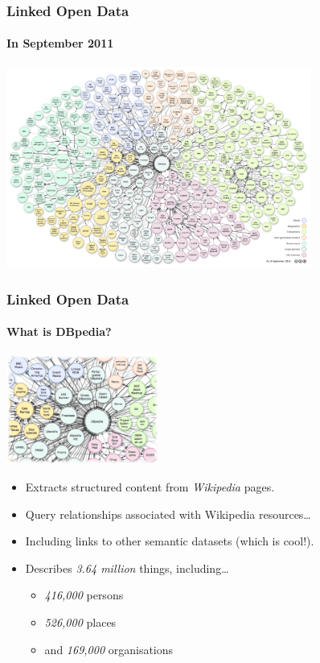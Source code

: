 \documentclass{beamer}
\begin{document}
\begin{frame}
\frametitle{Linked Open Data}
\framesubtitle{In September 2011}

\begin{center}
\includegraphics[width=100mm]{images/lod-2011.pdf}
\end{center}

\end{frame}


\begin{frame}
\frametitle{Linked Open Data}
\framesubtitle{What is DBpedia?}

\begin{center}
\includegraphics[width=50mm]{images/lod-2011-dbpedia.pdf}
\end{center}

\begin{itemize}
\item Extracts structured content from \emph{Wikipedia} pages.
\item Query relationships associated with Wikipedia resources\ldots
\item Including links to other semantic datasets (which is cool!).
\item Describes \emph{3.64 million} things, including\ldots

\begin{itemize}
\item \emph{416,000} persons
\item \emph{526,000} places
\item and \emph{169,000} organisations
\end{itemize}

\end{itemize}

\end{frame}
\end{document}
